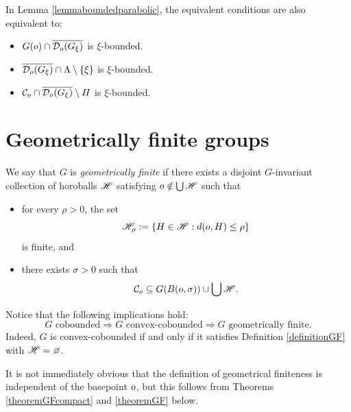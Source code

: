\begin{corollary}
\label{corollaryboundedparabolic}
In Lemma \ref{lemmaboundedparabolic}, the equivalent conditions  are also equivalent to:
\begin{itemize}
\item[(A$'$)] $G(o)\cap \overline{\mathcal D_o(G_\xi)}$ is $\xi$-bounded.
\item[(B$'$)] $\overline{\mathcal D_o(G_\xi)}\cap\Lambda\setminus\{\xi\}$ is $\xi$-bounded.
\item[(C$'$)] $\mathcal C_o\cap\overline{\mathcal D_o(G_\xi)}\setminus H$ is $\xi$-bounded.
\end{itemize}
\end{corollary}




\bigskip
\section{Geometrically finite groups}

\begin{definition}\label{definitionGF}
We say that $G$ is \emph{geometrically finite} if there exists a disjoint $G$-invariant collection of horoballs $\mathscr H$ satisfying $o\notin\bigcup\mathscr H$ such that
\begin{itemize}
\item[(I)] for every $\rho > 0$, the set
\begin{equation}
\label{Hrhodef}
\mathscr H_\rho := \{ H\in\mathscr H : d(o,H) \leq \rho \}
\end{equation}
is finite, and
\item[(II)] there exists $\sigma > 0$ such that
\begin{equation}
\label{sigmadef}
\mathcal C_o \subseteq G(B(o,\sigma)) \cup \bigcup\mathscr H.
\end{equation}
\end{itemize}
\end{definition}

\begin{observation}
Notice that the following implications hold:
\[
\text{$G$ cobounded} \Rightarrow \text{$G$ convex-cobounded} \Rightarrow \text{$G$ geometrically finite} .
\]
Indeed, $G$ is convex-cobounded if and only if it satisfies Definition \ref{definitionGF} with $\scrH = \emptyset$.
\end{observation}

\begin{remark}
It is not immediately obvious that the definition of geometrical finiteness is independent of the basepoint $o$, but this follows from Theorems \ref{theoremGFcompact} and \ref{theoremGF} below.
\end{remark}

